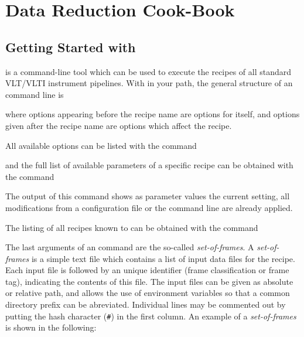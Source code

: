 \section{Data Reduction Cook-Book}
\label{sec:cookbook}


\subsection{Getting Started with \esorex{}}
\label{sec:esorex-quick}

\textit{\esorex{}} is a command-line tool which can be used to execute the
recipes of all standard VLT/VLTI instrument pipelines. With \textit{\esorex{}}
in your path, the general structure of an \textit{\esorex{}} 
command line is

\begin{shell}[fontsize=\small]
\end{shell}

where options appearing before the recipe name are options for
\textit{\esorex{}} itself, and options given after the recipe name are options
which affect the recipe. 

All available \textit{\esorex{}} options can be listed with the command
\begin{shell}[fontsize=\small]
\end{shell}

and the full list of available parameters of a specific recipe can be obtained
with the command 

\begin{shell}[fontsize=\small]
\end{shell}
The output of this command shows as parameter values the current setting, \ie
all modifications from a configuration file or the command line are already
applied.

The listing of all recipes known to \textit{\esorex{}} can be obtained with the command
\begin{shell}[fontsize=\small]
\end{shell}

The last arguments of an \textit{\esorex{}} command are the so-called
\textit{set-of-frames}. A \textit{set-of-frames} is a simple text file which
contains a list of input data files for the recipe. Each input file is
followed by an unique identifier (frame classification or frame tag),
indicating the contents of this file. The input files can be given as 
absolute or relative path, and \textit{\esorex{}} allows the use of environment variables so
that a common directory prefix can be abreviated. Individual lines may be
commented out by putting the hash character (\texttt{\#}) in the first
column. An example of a \textit{set-of-frames} is shown in the following:

